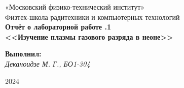 
\pagecolor{default_color}


\pagecolor{white}
\pagestyle{fancy}
\fancyhf{}
\rfoot{}


\thispagestyle{empty}

\begin{center}
\large{«Московский физико-технический институт»} \\  
\large{Физтех-школа радитехники и компьютерных технологий }\\
\vspace*{6cm}
{\bfseries
    {\Huge Отчёт о лабораторной работе .1  \\ <<Изучение плазмы  газового разряда в неоне>>}
}
\end{center}

\vspace*{1cm}
\begin{flushright}
    \large{
    \textbf{Выполнил:} \\ \textit{Деканоидзе М. Г., БО1-304} \\
    }
\end{flushright}

\vspace*{12cm}
\begin{center}
2024
\end{center}

\newpage